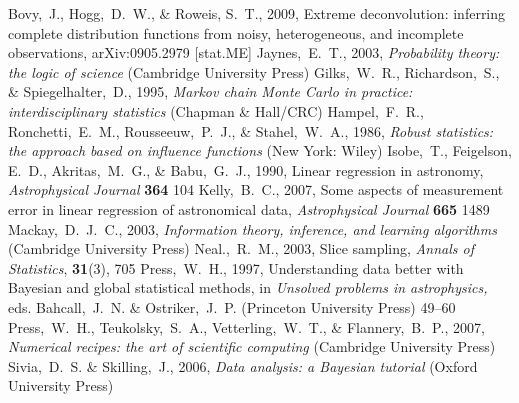 \documentclass[12pt,twoside,pdftex]{article}
\begin{document}
\clearpage
{}\theendnotes

\clearpage
\begin{thebibliography}{}
  Bovy,~J., Hogg,~D.~W., \& Roweis, S.~T., 2009,
  Extreme deconvolution: inferring complete distribution functions from noisy, heterogeneous, and incomplete observations, 
  arXiv:0905.2979 [stat.ME]
  Jaynes,~E.~T., 2003,
  \textit{Probability theory: the logic of science} (Cambridge University Press)
  Gilks,~W.~R., Richardson,~S., \& Spiegelhalter,~D., 1995,
  \textit{Markov chain Monte Carlo in practice: interdisciplinary statistics} (Chapman \& Hall/CRC)
  Hampel,~F.~R., Ronchetti,~E.~M., Rousseeuw,~P.~J., \& Stahel,~W.~A., 1986, 
  \textit{Robust statistics: the approach based on influence functions} (New York: Wiley)
  Isobe,~T., Feigelson, E.~D., Akritas,~M.~G., \& Babu,~G.~J., 1990,
  Linear regression in astronomy,
  \textit{Astrophysical Journal} \textbf{364} 104
  Kelly,~B.~C., 2007,
  Some aspects of measurement error in linear regression of astronomical data,
  \textit{Astrophysical Journal} \textbf{665} 1489
  Mackay,~D.~J.~C., 2003,
  \textit{Information theory, inference, and learning algorithms} (Cambridge University Press)
  Neal.,~R.~M., 2003,
  Slice sampling,
  \textit{Annals of Statistics}, \textbf{31}(3), 705
  Press,~W.~H., 1997,
  Understanding data better with Bayesian and global statistical methods,
  in \textit{Unsolved problems in astrophysics,}
  eds. Bahcall,~J.~N. \& Ostriker,~J.~P. (Princeton University Press)
  49--60
  Press,~W.~H., Teukolsky,~S.~A., Vetterling,~W.~T., \& Flannery,~B.~P., 2007,
  \textit{Numerical recipes: the art of scientific computing} (Cambridge University Press)
  Sivia,~D.~S. \& Skilling,~J., 2006,
  \textit{Data analysis: a Bayesian tutorial} (Oxford University Press)
\end{thebibliography}
\end{document}

